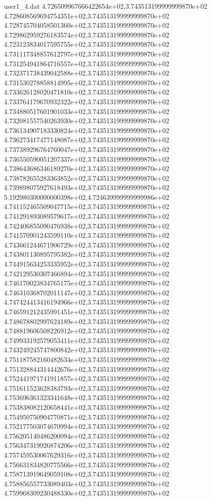 \begin{filecontents}{user1_4.dat}
4.726509967666422654e+02,3.743513199999999870e+02
4.728608569694754351e+02,3.743513199999999870e+02
4.728745704058501360e+02,3.743513199999999870e+02
4.729862959276183574e+02,3.743513199999999870e+02
4.723123834017595755e+02,3.743513199999999870e+02
4.731117348857612797e+02,3.743513199999999870e+02
4.731254941864716557e+02,3.743513199999999870e+02
4.732371738439042588e+02,3.743513199999999870e+02
4.731530278858814995e+02,3.743513199999999870e+02
4.733626128020471810e+02,3.743513199999999870e+02
4.733764179670932322e+02,3.743513199999999870e+02
4.734880517601901033e+02,3.743513199999999870e+02
4.732081557540263930e+02,3.743513199999999870e+02
4.736134907183330824e+02,3.743513199999999870e+02
4.736273417477148087e+02,3.743513199999999870e+02
4.737389296764760047e+02,3.743513199999999870e+02
4.736550590051207337e+02,3.743513199999999870e+02
4.738643686346189270e+02,3.743513199999999870e+02
4.738782655283363852e+02,3.743513199999999870e+02
4.739898075927618493e+02,3.743513199999999870e+02
5.192980300000000398e+02,4.724639999999999986e+02
4.741152465509047715e+02,3.743513199999999870e+02
4.741291893089579617e+02,3.743513199999999870e+02
4.742406855090476938e+02,3.743513199999999870e+02
4.741570901243599110e+02,3.743513199999999870e+02
4.743661244671906729e+02,3.743513199999999870e+02
4.743801130895795382e+02,3.743513199999999870e+02
4.744915634253335952e+02,3.743513199999999870e+02
4.742129530307466894e+02,3.743513199999999870e+02
4.746170023834765175e+02,3.743513199999999870e+02
4.746310368702011147e+02,3.743513199999999870e+02
4.747424413416194966e+02,3.743513199999999870e+02
4.746591212435991451e+02,3.743513199999999870e+02
4.748678802997624189e+02,3.743513199999999870e+02
4.748819606508226912e+02,3.743513199999999870e+02
4.749933192579053411e+02,3.743513199999999870e+02
4.743249245747800842e+02,3.743513199999999870e+02
4.751187582160482634e+02,3.743513199999999870e+02
4.751328844314442676e+02,3.743513199999999870e+02
4.752441971741911857e+02,3.743513199999999870e+02
4.751611523628383793e+02,3.743513199999999870e+02
4.753696361323341648e+02,3.743513199999999870e+02
4.753838082120658441e+02,3.743513199999999870e+02
4.754950750904770871e+02,3.743513199999999870e+02
4.752177503074670994e+02,3.743513199999999870e+02
4.756205140486200094e+02,3.743513199999999870e+02
4.756347319926874206e+02,3.743513199999999870e+02
4.757459530067629316e+02,3.743513199999999870e+02
4.756631834820775566e+02,3.743513199999999870e+02
4.758713919649059108e+02,3.743513199999999870e+02
4.758856557733089403e+02,3.743513199999999870e+02
4.759968309230488330e+02,3.743513199999999870e+02

\end{filecontents}
